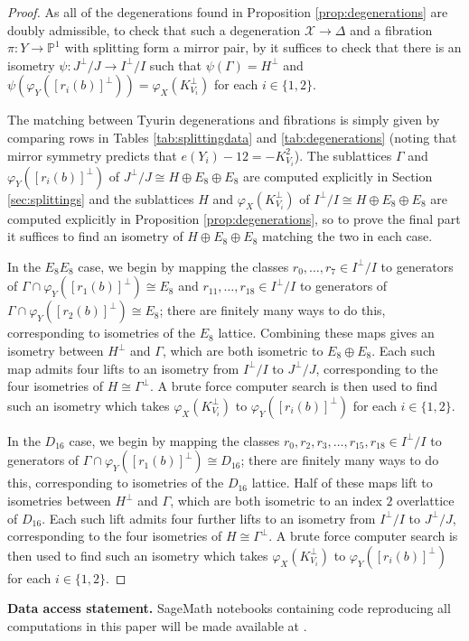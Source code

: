 \documentclass[a4paper]{amsart}
\theoremstyle{definition}
\theoremstyle{plain}
\theoremstyle{remark}
\newcommand{\bP}{\mathbb{P}}
\newcommand{\calX}{\mathcal{X}}
\numberwithin{figure}{section}
\numberwithin{table}{section}
\begin{document}
\begin{proof}
As all of the degenerations found in Proposition \ref{prop:degenerations} are doubly admissible, to check that such a degeneration $\calX \to \Delta$ and a fibration $\pi\colon Y \to \bP^1$ with splitting form a mirror pair, by \cite[Proposition 5.3]{dfk3slpms} it suffices to check that there is an isometry $\psi\colon J^{\perp}/J \to I^{\perp}/I$ such that $\psi(\Gamma) = H^{\perp}$ and $\psi(\varphi_Y([r_i(b)]^{\perp})) = \varphi_X(K_{V_i}^{\perp})$ for each $i \in \{1,2\}$.

The matching between Tyurin degenerations and fibrations is simply given by comparing rows in Tables \ref{tab:splittingdata} and \ref{tab:degenerations} (noting that mirror symmetry predicts that $e(Y_i) - 12 = -K_{V_i}^2$).  The sublattices $\Gamma$ and $\varphi_Y([r_i(b)]^{\perp})$ of $J^{\perp}/J \cong H \oplus E_8 \oplus E_8$ are computed explicitly in Section \ref{sec:splittings} and the sublattices $H$ and $\varphi_X(K_{V_i}^\perp)$ of $I^{\perp}/I \cong H \oplus E_8 \oplus E_8$ are computed explicitly in Proposition \ref{prop:degenerations}, so to prove the final part it suffices to find an isometry of $H \oplus E_8 \oplus E_8$ matching the two in each case. 

In the $E_8E_8$ case, we begin by mapping the classes $r_0,\ldots,r_7 \in I^{\perp}/I$ to generators of $\Gamma \cap \varphi_Y([r_1(b)]^{\perp}) \cong E_8$ and $r_{11},\ldots,r_{18} \in I^{\perp}/I$ to generators of $\Gamma \cap \varphi_Y([r_2(b)]^{\perp}) \cong E_8$; there are finitely many ways to do this, corresponding to isometries of the $E_8$ lattice. Combining these maps gives an isometry between $H^{\perp}$ and $\Gamma$, which are both isometric to $E_8 \oplus E_8$. Each such map admits four lifts to an isometry from $I^{\perp}/I$ to $J^{\perp}/J$, corresponding to the four isometries of $H \cong \Gamma^{\perp}$. A brute force computer search is then used to find such an isometry which takes $\varphi_X(K_{V_i}^{\perp})$ to $\varphi_Y([r_i(b)]^{\perp})$ for each $i \in \{1,2\}$.

In the $D_{16}$ case, we begin by mapping the classes $r_0,r_2,r_3,\ldots,r_{15},r_{18} \in I^{\perp}/I$ to generators of $\Gamma \cap \varphi_Y([r_1(b)]^{\perp}) \cong D_{16}$; there are finitely many ways to do this, corresponding to isometries of the $D_{16}$ lattice. Half of these maps lift to isometries between $H^{\perp}$ and $\Gamma$, which are both isometric to an index $2$ overlattice of $D_{16}$. Each such lift admits four further lifts to an isometry from $I^{\perp}/I$ to $J^{\perp}/J$, corresponding to the four isometries of $H \cong \Gamma^{\perp}$. A brute force computer search is then used to find such an isometry which takes $\varphi_X(K_{V_i}^{\perp})$ to $\varphi_Y([r_i(b)]^{\perp})$ for each $i \in \{1,2\}$.
\end{proof}

\textbf{Data access statement.} SageMath notebooks containing code reproducing all computations in this paper will be made available at \cite{Hpolcode}.



\end{document}
